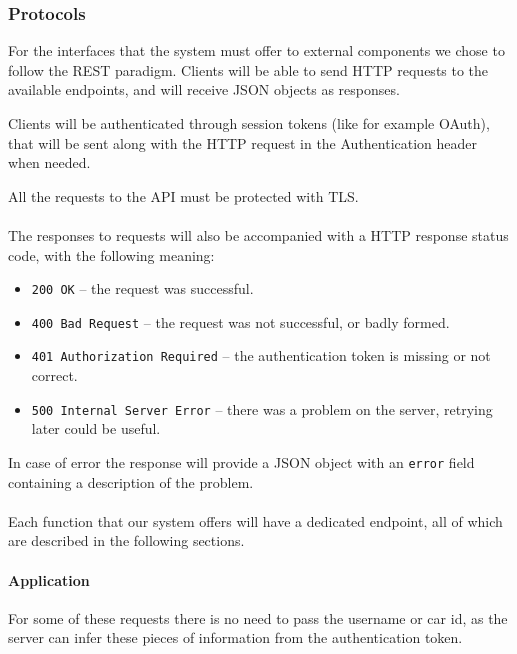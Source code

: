 \documentclass[english]{article}
\newcommand{\code}[1]{\texttt{#1}}
\begin{document}
\subsubsection{Protocols}

For the interfaces that the system must offer to external components we chose to follow the REST paradigm.
Clients will be able to send HTTP requests to the available endpoints, and will receive JSON objects as responses.

Clients will be authenticated through session tokens (like for example OAuth), that will be sent along with the HTTP request in the Authentication header when needed.

All the requests to the API must be protected with TLS.

\paragraph{}
The responses to requests will also be accompanied with a HTTP response status code, with the following meaning:
\begin{itemize}
	\item{\code{200 OK} -- the request was successful.}
	\item{\code{400 Bad Request} -- the request was not successful, or badly formed.}
	\item{\code{401 Authorization Required} -- the authentication token is missing or not correct.}
	\item{\code{500 Internal Server Error} -- there was a problem on the server, retrying later could be useful.}
\end{itemize}

In case of error the response will provide a JSON object with an \code{error} field containing a description of the problem.

\paragraph{}
Each function that our system offers will have a dedicated endpoint, all of which are described in the following sections.

\paragraph{Application}
For some of these requests there is no need to pass the username or car id, as the server can infer these pieces of information from the authentication token.
\end{document}
